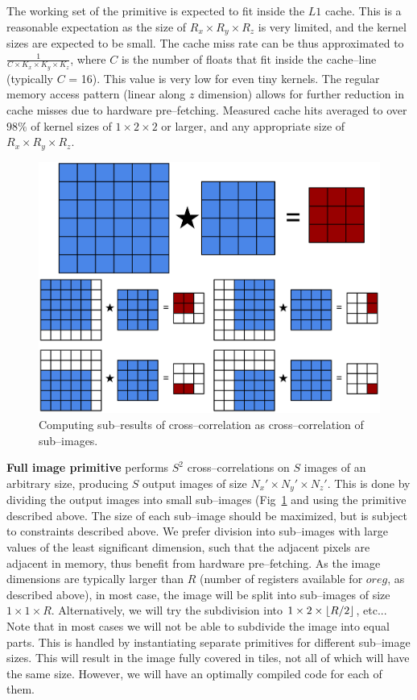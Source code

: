   The working set of the primitive is expected to fit inside the $L1$
  cache.  This is a reasonable expectation as the size of $R_x \times
  R_y \times R_z$ is very limited, and the kernel sizes are expected
  to be small.  The cache miss rate can be thus approximated to
  $\frac{1}{C \times K_x \times K_y \times K_z}$, where $C$ is the
  number of floats that fit inside the cache--line (typically $C$ =
  16).  This value is very low for even tiny kernels.  The regular
  memory access pattern (linear along $z$ dimension) allows for
  further reduction in cache misses due to hardware pre--fetching.
  Measured cache hits averaged to over $98\%$ of kernel sizes of $1
  \times 2 \times 2$ or larger, and any appropriate size of $R_x
  \times R_y \times R_z$.

  \begin{figure}
    \begin{center}
      \includegraphics[width=0.57\linewidth]{fig/division}
    \end{center}
    \caption{Computing sub--results of cross--correlation as
      cross--correlation of sub--images.}
    \label{fig:conv-division}
  \end{figure}

  {\bf Full image primitive} performs $S^2$ cross--correlations on $S$ images
  of an arbitrary size, producing $S$ output images of size $N_x'
  \times N_y' \times N_z'$.  This is done by dividing the output
  images into small sub--images (Fig~\ref{fig:conv-division} and using
  the primitive described above.  The size of each sub--image should
  be maximized, but is subject to constraints described above.  We
  prefer division into sub--images with large values of the least
  significant dimension, such that the adjacent pixels are adjacent in
  memory, thus benefit from hardware pre--fetching.  As the image
  dimensions are typically larger than $R$ (number of registers
  available for $oreg$, as described above), in most case, the image
  will be split into sub--images of size $1 \times 1 \times R$.
  Alternatively, we will try the subdivision into $1 \times 2 \times
  \lfloor R/2\rfloor$, etc...  Note that in most cases we will not be able to
  subdivide the image into equal parts.  This is handled by
  instantiating separate primitives for different sub--image sizes.
  This will result in the image fully covered in tiles, not all of
  which will have the same size.  However, we will have an optimally
  compiled code for each of them.

